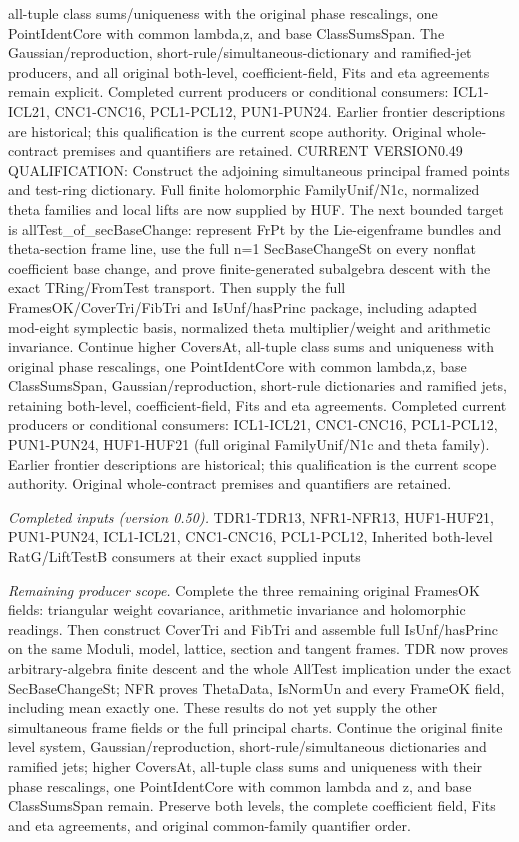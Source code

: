 all-tuple class sums/uniqueness with the original phase rescalings, one PointIdentCore with common lambda,z, and base ClassSumsSpan. The Gaussian/reproduction, short-rule/simultaneous-dictionary and ramified-jet producers, and all original both-level, coefficient-field, Fits and eta agreements remain explicit. Completed current producers or conditional consumers: ICL1-ICL21, CNC1-CNC16, PCL1-PCL12, PUN1-PUN24. Earlier frontier descriptions are historical; this qualification is the current scope authority. Original whole-contract premises and quantifiers are retained. CURRENT VERSION0.49 QUALIFICATION: Construct the adjoining simultaneous principal framed points and test-ring dictionary. Full finite holomorphic FamilyUnif/N1c, normalized theta families and local lifts are now supplied by HUF. The next bounded target is allTest\_\allowbreak of\_\allowbreak secBaseChange: represent FrPt by the Lie-eigenframe bundles and theta-section frame line, use the full n=1 SecBaseChangeSt on every nonflat coefficient base change, and prove finite-generated subalgebra descent with the exact TRing/FromTest transport. Then supply the full FramesOK/CoverTri/FibTri and IsUnf/hasPrinc package, including adapted mod-eight symplectic basis, normalized theta multiplier/weight and arithmetic invariance. Continue higher CoversAt, all-tuple class sums and uniqueness with original phase rescalings, one PointIdentCore with common lambda,z, base ClassSumsSpan, Gaussian/reproduction, short-rule dictionaries and ramified jets, retaining both-level, coefficient-field, Fits and eta agreements. Completed current producers or conditional consumers: ICL1-ICL21, CNC1-CNC16, PCL1-PCL12, PUN1-PUN24, HUF1-HUF21 (full original FamilyUnif/N1c and theta family). Earlier frontier descriptions are historical; this qualification is the current scope authority. Original whole-contract premises and quantifiers are retained.

\emph{Completed inputs (version 0.50).} TDR1-TDR13, NFR1-NFR13, HUF1-HUF21, PUN1-PUN24, ICL1-ICL21, CNC1-CNC16, PCL1-PCL12, Inherited both-level RatG/LiftTestB consumers at their exact supplied inputs

\emph{Remaining producer scope.} Complete the three remaining original FramesOK fields: triangular weight covariance, arithmetic invariance and holomorphic readings. Then construct CoverTri and FibTri and assemble full IsUnf/hasPrinc on the same Moduli, model, lattice, section and tangent frames. TDR now proves arbitrary-algebra finite descent and the whole AllTest implication under the exact SecBaseChangeSt; NFR proves ThetaData, IsNormUn and every FrameOK field, including mean exactly one. These results do not yet supply the other simultaneous frame fields or the full principal charts. Continue the original finite level system, Gaussian/reproduction, short-rule/simultaneous dictionaries and ramified jets; higher CoversAt, all-tuple class sums and uniqueness with their phase rescalings, one PointIdentCore with common lambda and z, and base ClassSumsSpan remain. Preserve both levels, the complete coefficient field, Fits and eta agreements, and original common-family quantifier order.



